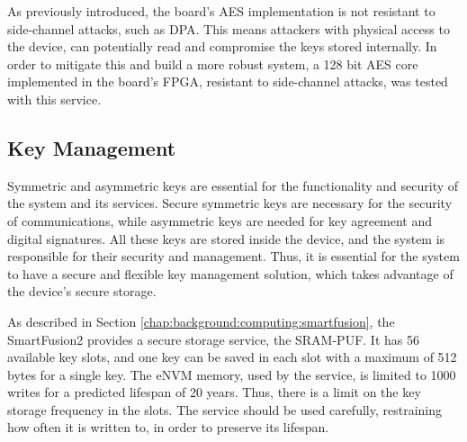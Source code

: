 As previously introduced, the board's AES implementation is not resistant to side-channel attacks, such as DPA. This means attackers with physical access to the device, can potentially read and compromise the keys stored internally. In order to mitigate this and build a more robust system, a 128 bit AES core implemented in the board's FPGA, resistant to side-channel attacks, was tested with this service.

\subsection{Key Management}\label{chap:implementation:services:key-import}

Symmetric and asymmetric keys are essential for the functionality and security of the system and its services. Secure symmetric keys are necessary for the security of communications, while asymmetric keys are needed for key agreement and digital signatures.
All these keys are stored inside the device, and the system is responsible for their security and management. Thus, it is essential for the system to have a secure and flexible key management solution, which takes advantage of the device's secure storage.

As described in Section \ref{chap:background:computing:smartfusion}, the SmartFusion2 provides a secure storage service, the SRAM-PUF. It has 56 available key slots, and one key can be saved in each slot with a maximum of 512 bytes for a single key.
The eNVM memory, used by the service, is limited to 1000 writes for a predicted lifespan of 20 years. Thus, there is a limit on the key storage frequency in the slots. The service should be used carefully, restraining how often it is written to, in order to preserve its lifespan.

